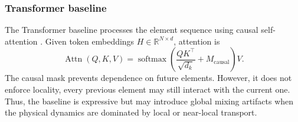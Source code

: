 \subsubsection{Transformer baseline}
The Transformer baseline processes the element sequence using causal self-attention \cite{vaswani_attention_2017}. Given token embeddings $H\in\mathbb{R}^{N\times d}$, attention is
\begin{equation}
    \operatorname{Attn}(Q,K,V)=\operatorname{softmax}\left(\frac{QK^{\top}}{\sqrt{d_k}}+M_{\mathrm{causal}}\right)V.
    \label{eq:attention_revised}
\end{equation}
The causal mask prevents dependence on future elements. However, it does not enforce locality, every previous element may still interact with the current one. Thus, the baseline is expressive but may introduce global mixing artifacts when the physical dynamics are dominated by local or near-local transport.

